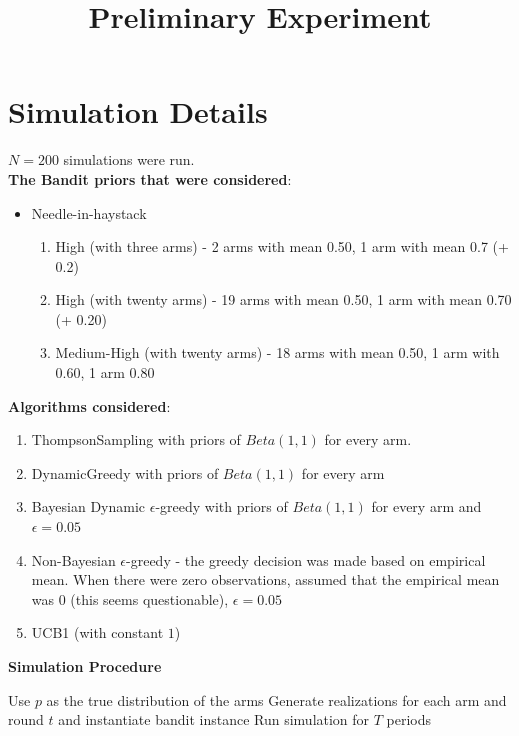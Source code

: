 \documentclass[11pt,letterpaper]{article}
\begin{document}
 

\title{Preliminary Experiment}
\maketitle

\section*{Simulation Details}

$N = 200$ simulations were run. \\
\textbf{The Bandit priors that were considered}:
\begin{itemize}
\item Needle-in-haystack
\begin{enumerate}
\item High (with three arms) - 2 arms with mean 0.50, 1 arm with mean 0.7 (+ 0.2)
\item High (with twenty arms) - 19 arms with mean 0.50, 1 arm with mean 0.70 (+ 0.20)
\item Medium-High (with twenty arms) - 18 arms with mean 0.50, 1 arm with 0.60, 1 arm 0.80
\end{enumerate}
\end{itemize}
\textbf{Algorithms considered}:
\begin{enumerate}
\item ThompsonSampling with priors of $Beta(1, 1)$ for every arm.
\item DynamicGreedy with priors of $Beta(1, 1)$ for every arm
\item Bayesian Dynamic $\epsilon$-greedy with priors of $Beta(1, 1)$ for every arm and $\epsilon = 0.05$
\item Non-Bayesian $\epsilon$-greedy - the greedy decision was made based on empirical mean. When there were zero observations, assumed that the empirical mean was 0 (this seems questionable), $\epsilon = 0.05$
\item UCB1 (with constant $1$)
\end{enumerate}
\pagebreak
\textbf{Simulation Procedure}
\begin{algorithm}
\begin{algorithmic}[1]
		\State Use $p$ as the true distribution of the arms
		\State Generate realizations for each arm and round $t$ and instantiate bandit instance
			\State Run simulation for $T$ periods
		\EndFor
	\EndFor
\EndFor
\end{algorithmic}
\end{algorithm}
\end{document}
